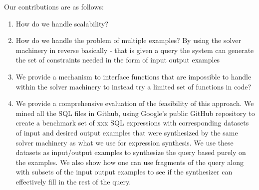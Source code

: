 Our contributions are as follows:
\begin{enumerate}
\item How do we handle scalability?
\item How do we handle the problem of multiple examples?  By using the solver machinery in reverse basically - that is given a query the system can generate the set of constraints needed in the form of input output examples
\item We provide a mechanism to interface functions that are impossible to handle within the solver machinery to instead try a limited set of functions in code?
\item We provide a comprehensive evaluation of the feasibility of this approach.  We mined all the SQL files in Github, using Google's public GitHub repository \cite{GitHub_repo} to create a benchmark set of xxx SQL expressions with corresponding datasets of input and desired output examples that were synthesized by the same solver machinery as what we use for expression synthesis. We use these datasets as input/output examples to synthesize the query based purely on the examples.  We also show how one can use fragments of the query along with subsets of the input output examples to see if the synthesizer can effectively fill in the rest of the query.  
\end{enumerate}
